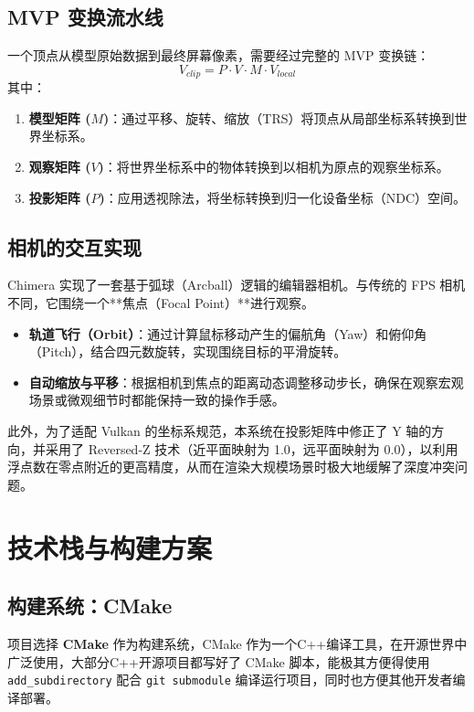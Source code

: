 \subsection{MVP 变换流水线}
一个顶点从模型原始数据到最终屏幕像素，需要经过完整的 MVP 变换链：
\begin{equation}
    V_{clip} = P \cdot V \cdot M \cdot V_{local}
\end{equation}
其中：
\begin{enumerate}
    \item \textbf{模型矩阵 ($M$)}：通过平移、旋转、缩放（TRS）将顶点从局部坐标系转换到世界坐标系。
    \item \textbf{观察矩阵 ($V$)}：将世界坐标系中的物体转换到以相机为原点的观察坐标系。
    \item \textbf{投影矩阵 ($P$)}：应用透视除法，将坐标转换到归一化设备坐标（NDC）空间。
\end{enumerate}

\subsection{相机的交互实现}
Chimera 实现了一套基于弧球（Arcball）逻辑的编辑器相机。与传统的 FPS 相机不同，它围绕一个**焦点（Focal Point）**进行观察。
\begin{itemize}
    \item \textbf{轨道飞行（Orbit）}：通过计算鼠标移动产生的偏航角（Yaw）和俯仰角（Pitch），结合四元数旋转，实现围绕目标的平滑旋转。
    \item \textbf{自动缩放与平移}：根据相机到焦点的距离动态调整移动步长，确保在观察宏观场景或微观细节时都能保持一致的操作手感。
\end{itemize}

此外，为了适配 Vulkan 的坐标系规范，本系统在投影矩阵中修正了 Y 轴的方向，并采用了 Reversed-Z 技术（近平面映射为 1.0，远平面映射为 0.0），以利用浮点数在零点附近的更高精度，从而在渲染大规模场景时极大地缓解了深度冲突问题。

\section{技术栈与构建方案}

\subsection{构建系统：CMake}
项目选择 \textbf{CMake} 作为构建系统，CMake 作为一个C++编译工具，在开源世界中广泛使用，大部分C++开源项目都写好了 CMake 脚本，能极其方便得使用 \texttt{add\_subdirectory} 配合 \texttt{git submodule} 编译运行项目，同时也方便其他开发者编译部署。

